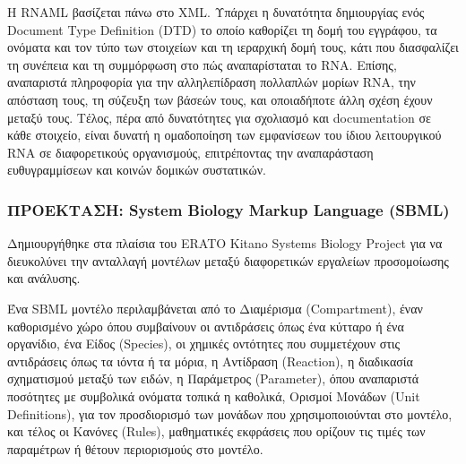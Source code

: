             Η RNAML βασίζεται πάνω στο XML.
            Υπάρχει η δυνατότητα δημιουργίας ενός Document Type Definition (DTD) το οποίο καθορίζει τη δομή του εγγράφου, τα ονόματα και τον τύπο των στοιχείων και τη ιεραρχική δομή τους, κάτι που διασφαλίζει τη συνέπεια και τη συμμόρφωση στο πώς αναπαρίσταται το RNA.
            Επίσης, αναπαριστά πληροφορία για την αλληλεπίδραση πολλαπλών μορίων RNA, την απόσταση τους, τη σύζευξη των βάσεών τους, και οποιαδήποτε άλλη σχέση έχουν μεταξύ τους.
            Τέλος, πέρα από δυνατότητες για σχολιασμό και documentation σε κάθε στοιχείο, είναι δυνατή η ομαδοποίηση των εμφανίσεων του ίδιου λειτουργικού RNA σε διαφορετικούς οργανισμούς, επιτρέποντας την αναπαράσταση ευθυγραμμίσεων και κοινών δομικών συστατικών.

        \subsubsection{ΠΡΟΕΚΤΑΣΗ: System Biology Markup Language (SBML)}
            Δημιουργήθηκε στα πλαίσια του ERATO Kitano Systems Biology Project για να διευκολύνει την ανταλλαγή μοντέλων μεταξύ διαφορετικών εργαλείων προσομοίωσης και ανάλυσης. \cite{SBML}

            Ένα SBML μοντέλο περιλαμβάνεται από το Διαμέρισμα (Compartment), έναν καθορισμένο χώρο όπου συμβαίνουν οι αντιδράσεις όπως ένα κύτταρο ή ένα οργανίδιο,
                ένα Eίδος (Species), οι χημικές οντότητες που συμμετέχουν στις αντιδράσεις όπως τα ιόντα ή τα μόρια, η Αντίδραση (Reaction), η διαδικασία σχηματισμού μεταξύ των ειδών,
                η Παράμετρος (Parameter), όπου αναπαριστά ποσότητες με συμβολικά ονόματα τοπικά η καθολικά, Ορισμοί Μονάδων (Unit Definitions), για τον προσδιορισμό των μονάδων που χρησιμοποιούνται στο μοντέλο,
                και τέλος οι Κανόνες (Rules), μαθηματικές εκφράσεις που ορίζουν τις τιμές των παραμέτρων ή θέτουν περιορισμούς στο μοντέλο.

